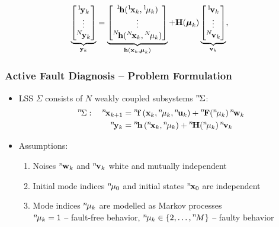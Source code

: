 \documentclass[usenames,dvipsnames]{beamer}
\def\ist{\prescript{1\!}{}}
\def\iind{\prescript{2\!}{}}
\def\nth{\prescript{n\!}{}}
\def\Nth{\prescript{N\!}{}}
\begin{document}
\begin{frame}
\begin{center}
{{\begin{align*}
            \underbrace{
              \begin{bmatrix}
                \ist{\bfy}_{k}\\
                \vdots\\
                \Nth{\bfy}_{k}
            \end{bmatrix}}_{\bfy_{k}}&=
            \underbrace{
              \begin{bmatrix}
                \ist{\bfh}(\ist{\bfx}_{k},\ist{\mu}_{k})\\
                \vdots\\
                \Nth{\bfh}(\Nth{\bfx}_{k},\Nth{\mu}_{k})
            \end{bmatrix}}_{\bfh(\bfx_{k},\bfmu_{k})}+
            \bfH(\bfmu_k)
            \underbrace{
              \begin{bmatrix}
                \ist{\bfv}_{k}\\
                \vdots\\
                \Nth{\bfv}_{k}
            \end{bmatrix}}_{\bfv_k},
      \end{align*}}}
    \end{center}
  \end{frame}
\begin{frame}
  \frametitle{Active Fault Diagnosis -- Problem Formulation}
  \begin{itemize}
    \item LSS $\Sigma$ consists of $N$ weakly coupled subsystems
      $\nth{\Sigma}$:
      \begin{align*} 
    \nth{\Sigma}:\quad \nth{\bfx}_{k+1} &= \nth{\bff} \left(
    \bfx_{k},\nth{\mu}_{k},\nth{\bfu}_{k} \right) +
    \nth{\bfF}(\nth{\mu}_k)\nth{\bfw}_k\\
    \nth{\bfy}_{k} &= \nth{\bfh} \left(
    \nth{\bfx}_{k},\nth{\mu}_{k}\right) + \nth{\bfH}(\nth{\mu}_k)\nth{\bfv}_k
      \end{align*}
 \item<2-> Assumptions:
\begin{enumerate}
  \item Noises $\nth{\bfw}_k$ and $\nth{\bfv}_k$ white and mutually independent
  \item Initial mode indices $\nth{\mu}_{0}$ and initial states $\nth{\bfx}_{0}$ are independent
  \item Mode indices  $\nth{\mu}_{k}$ are modelled as Markov processes\\ %
      \alert{$\nth{\mu}_{k}=1$} -- fault-free behavior, \alert{$\nth{\mu}_{k}\in\{2,\ldots,\nth{M}\}$} -- faulty behavior
\end{enumerate}
  \end{itemize}
\end{frame}
\end{document}
